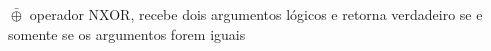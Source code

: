 

\begin{simbolos}
  \item[$ \bar{\oplus} $] operador NXOR, recebe dois argumentos lógicos e retorna verdadeiro se e somente se os argumentos forem iguais %
\end{simbolos}





